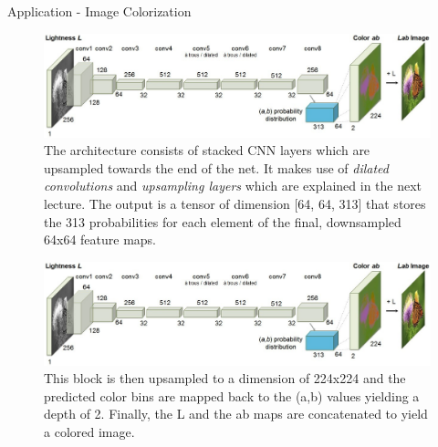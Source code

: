 \begin{vbframe}{Application - Image Colorization}
\begin{figure}
            \end{figure}
            \framebreak
            \begin{figure}
            \centering
            \includegraphics[width=11.5cm]{figure/color_architecture.png}
            \caption{The architecture consists of stacked CNN layers which are upsampled towards the end of the net. It makes use of \textit{dilated convolutions} and \textit{upsampling layers} which are explained in the next lecture. The output is a tensor of dimension [64, 64, 313] that stores the 313 probabilities for each element of the final, downsampled 64x64 feature maps.} 
            \end{figure}
            \framebreak
            \begin{figure}
            \centering
            \includegraphics[width=11.5cm]{figure/color_architecture.png}
            \caption{This block is then upsampled to a dimension of 224x224 and the predicted color bins are mapped back to the (a,b) values yielding a depth of 2. Finally, the L and the ab maps are concatenated to yield a colored image.} 
            \end{figure}
            \end{vbframe}
